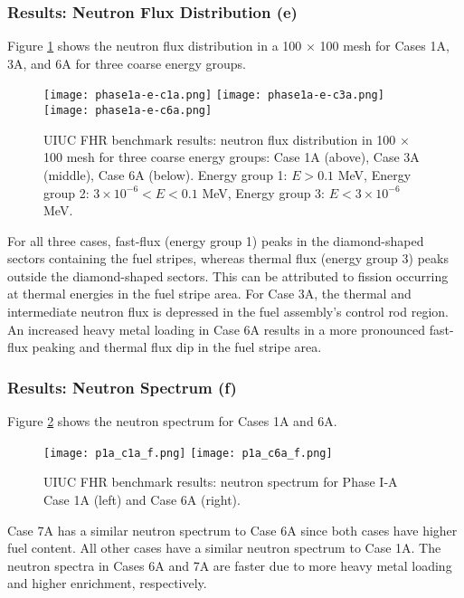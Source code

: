 \subsubsection{Results: Neutron Flux Distribution (e)}
Figure \ref{fig:phase1a-e} shows the neutron flux distribution in a 100 $\times$ 
100 mesh for Cases 1A, 3A, and 6A for three coarse energy groups. 
\begin{figure}[htbp]
    \centering
    \texttt{[image: phase1a-e-c1a.png]} 
    \texttt{[image: phase1a-e-c3a.png]} 
    \texttt{[image: phase1a-e-c6a.png]} 
    \caption{\gls{UIUC} \gls{FHR} benchmark results: neutron flux 
    distribution in 100 $\times$ 100 mesh for three coarse energy groups: Case 
    1A (above), Case 3A (middle), Case 6A (below). Energy group 1: $E > 0.1$ MeV, 
    Energy group 2: $3 \times 10^{-6} < E < 0.1$ MeV, Energy group 3: $E < 3 \times 10^{-6}$ MeV. }
    \label{fig:phase1a-e}
\end{figure}
For all three cases, fast-flux (energy group 1) peaks in the diamond-shaped sectors containing 
the fuel stripes, whereas thermal flux (energy group 3) peaks outside the diamond-shaped 
sectors. 
This can be attributed to fission occurring at thermal energies in the fuel stripe area. 
For Case 3A, the thermal and intermediate neutron flux is depressed in the fuel 
assembly's control rod region.  
An increased heavy metal loading in Case 6A results in a more pronounced 
fast-flux peaking and thermal flux dip in the fuel stripe area. 

\subsubsection{Results: Neutron Spectrum (f)}
Figure \ref{fig:phase1a-f} shows the neutron spectrum for Cases 1A and 6A. 
\begin{figure}[htbp]
    \centering
    \texttt{[image: p1a\_c1a\_f.png]} 
    \texttt{[image: p1a\_c6a\_f.png]} 
    \caption{\gls{UIUC} \gls{FHR} benchmark results: neutron spectrum for 
    Phase I-A Case 1A (left) and Case 6A (right).}
    \label{fig:phase1a-f}
\end{figure}
Case 7A has a similar neutron spectrum to Case 6A since both cases have 
higher fuel content. 
All other cases have a similar neutron spectrum to Case 1A.
The neutron spectra in Cases 6A and 7A are faster due to more heavy metal 
loading and higher enrichment, respectively.  

